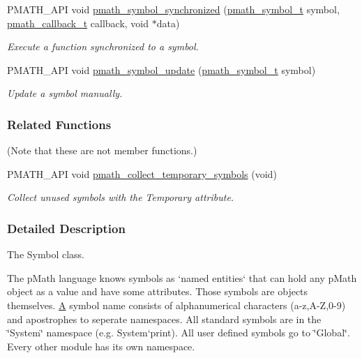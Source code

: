 \begin{CompactItemize}
PMATH\_\-API void \hyperlink{group__symbols_g95b141d9cb33fba80d6a807f304ee3b7}{pmath\_\-symbol\_\-synchronized} (\hyperlink{classpmath__symbol__t}{pmath\_\-symbol\_\-t} symbol, \hyperlink{group__general__types_ge1a454657f18f3cc54508adeccccbcbc}{pmath\_\-callback\_\-t} callback, void $\ast$data)
\begin{CompactList}\small\item\em Execute a function synchronized to a symbol. \item\end{CompactList}\item 
PMATH\_\-API void \hyperlink{group__symbols_g7cd56e2b77ac13a11f1b6f7fd13ba357}{pmath\_\-symbol\_\-update} (\hyperlink{classpmath__symbol__t}{pmath\_\-symbol\_\-t} symbol)
\begin{CompactList}\small\item\em Update a symbol manually. \item\end{CompactList}\end{CompactItemize}
\subsubsection*{Related Functions}
(Note that these are not member functions.) \begin{CompactItemize}
\item 
PMATH\_\-API void \hyperlink{classpmath__symbol__t_8b277745c51f34c11ed78c10a2ecb44b}{pmath\_\-collect\_\-temporary\_\-symbols} (void)
\begin{CompactList}\small\item\em Collect unused symbols with the Temporary attribute. \item\end{CompactList}\end{CompactItemize}


\subsubsection{Detailed Description}
The Symbol class. 

The pMath language knows symbols as `named entities` that can hold any pMath object as a value and have some attributes. Those symbols are objects themselves. \hyperlink{class_a}{A} symbol name consists of alphanumerical characters (a-z,A-Z,0-9) and apostrophes to seperate namespaces. All standard symbols are in the \char`\"{}System\char`\"{} namespace (e.g. System`print). All user defined symbols go to \char`\"{}Global\char`\"{}. Every other module has its own namespace.

